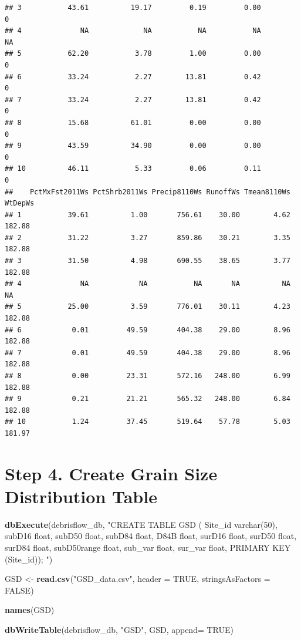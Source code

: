 \documentclass[
]{book}
\newenvironment{Shaded}{\begin{snugshade}}{\end{snugshade}}
\newcommand{\DataTypeTok}[1]{\textcolor[rgb]{0.13,0.29,0.53}{#1}}
\newcommand{\KeywordTok}[1]{\textcolor[rgb]{0.13,0.29,0.53}{\textbf{#1}}}
\newcommand{\NormalTok}[1]{#1}
\newcommand{\OtherTok}[1]{\textcolor[rgb]{0.56,0.35,0.01}{#1}}
\newcommand{\StringTok}[1]{\textcolor[rgb]{0.31,0.60,0.02}{#1}}
\begin{document}
\begin{verbatim}
## 3           43.61          19.17         0.19         0.00              0
## 4              NA             NA           NA           NA             NA
## 5           62.20           3.78         1.00         0.00              0
## 6           33.24           2.27        13.81         0.42              0
## 7           33.24           2.27        13.81         0.42              0
## 8           15.68          61.01         0.00         0.00              0
## 9           43.59          34.90         0.00         0.00              0
## 10          46.11           5.33         0.06         0.11              0
##    PctMxFst2011Ws PctShrb2011Ws Precip8110Ws RunoffWs Tmean8110Ws WtDepWs
## 1           39.61          1.00       756.61    30.00        4.62  182.88
## 2           31.22          3.27       859.86    30.21        3.35  182.88
## 3           31.50          4.98       690.55    38.65        3.77  182.88
## 4              NA            NA           NA       NA          NA      NA
## 5           25.00          3.59       776.01    30.11        4.23  182.88
## 6            0.01         49.59       404.38    29.00        8.96  182.88
## 7            0.01         49.59       404.38    29.00        8.96  182.88
## 8            0.00         23.31       572.16   248.00        6.99  182.88
## 9            0.21         21.21       565.32   248.00        6.84  182.88
## 10           1.24         37.45       519.64    57.78        5.03  181.97
\end{verbatim}

\hypertarget{step-4.-create-grain-size-distribution-table}{%
\section{Step 4. Create Grain Size Distribution Table}\label{step-4.-create-grain-size-distribution-table}}

\begin{Shaded}
\begin{Highlighting}[]
\KeywordTok{dbExecute}\NormalTok{(debrisflow_db, }\StringTok{"CREATE TABLE GSD (}
\StringTok{          Site_id varchar(50),}
\StringTok{          subD16 float,}
\StringTok{          subD50 float,}
\StringTok{          subD84 float,}
\StringTok{          D84B float,}
\StringTok{          surD16 float,}
\StringTok{          surD50 float,}
\StringTok{          surD84 float,}
\StringTok{          subD50range float,}
\StringTok{          sub_var float, }
\StringTok{          sur_var float, }
\StringTok{          PRIMARY KEY (Site_id));}
\StringTok{          "}\NormalTok{)}

\NormalTok{GSD <-}\StringTok{ }\KeywordTok{read.csv}\NormalTok{(}\StringTok{"GSD_data.csv"}\NormalTok{, }\DataTypeTok{header =} \OtherTok{TRUE}\NormalTok{, }\DataTypeTok{stringsAsFactors =} \OtherTok{FALSE}\NormalTok{)}

\KeywordTok{names}\NormalTok{(GSD)}

\KeywordTok{dbWriteTable}\NormalTok{(debrisflow_db, }\StringTok{"GSD"}\NormalTok{, GSD, }\DataTypeTok{append=} \OtherTok{TRUE}\NormalTok{)}
\end{Highlighting}
\end{Shaded}
\end{document}

